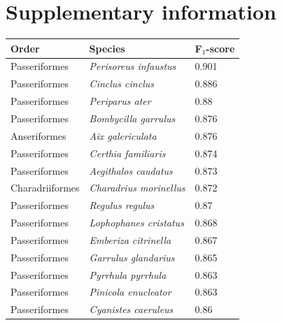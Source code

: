 \documentclass{article}
\begin{document}



\newpage

\section*{Supplementary information}
\renewcommand{\thetable}{S\arabic{table}}
\setcounter{table}{0}

\begin{longtable}{|p{} | p{} | p{} |}
  \hline
  \textbf{Order}  & \textbf{Species}                       & \textbf{F$_1$-score} \\ [0.5ex]
  \hline

  Passeriformes   & \textit{Perisoreus infaustus}          & 0.901                \\ \hline
  Passeriformes   & \textit{Cinclus cinclus}               & 0.886                \\ \hline
  Passeriformes   & \textit{Periparus ater}                & 0.88                 \\ \hline
  Passeriformes   & \textit{Bombycilla garrulus}           & 0.876                \\ \hline
  Anseriformes    & \textit{Aix galericulata}              & 0.876                \\ \hline
  Passeriformes   & \textit{Certhia familiaris}            & 0.874                \\ \hline
  Passeriformes   & \textit{Aegithalos caudatus}           & 0.873                \\ \hline
  Charadriiformes & \textit{Charadrius morinellus}         & 0.872                \\ \hline
  Passeriformes   & \textit{Regulus regulus}               & 0.87                 \\ \hline
  Passeriformes   & \textit{Lophophanes cristatus}         & 0.868                \\ \hline
  Passeriformes   & \textit{Emberiza citrinella}           & 0.867                \\ \hline
  Passeriformes   & \textit{Garrulus glandarius}           & 0.865                \\ \hline
  Passeriformes   & \textit{Pyrrhula pyrrhula}             & 0.863                \\ \hline
  Passeriformes   & \textit{Pinicola enucleator}           & 0.863                \\ \hline
  Passeriformes   & \textit{Cyanistes caeruleus}           & 0.86                 \\ \hline

\end{longtable}
\end{document}
